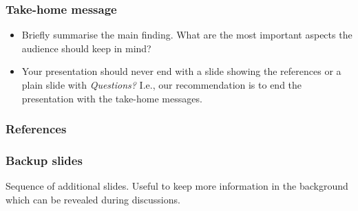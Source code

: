 \documentclass[t,english]{beamer}
\begin{document}

\begin{frame}
  \frametitle{Take-home message}
  
  \begin{itemize}
      \item Briefly summarise the main finding. What are the most important aspects the audience should keep in mind?
      \item Your presentation should never end with a slide showing the references or a plain slide with \emph{Questions?} I.e., our recommendation is to end the presentation with the take-home messages.
  \end{itemize}
\end{frame}

\appendix


\begin{frame}[allowframebreaks]
  \frametitle{References}
  \printbibliography[heading=none]
\end{frame}


\begin{frame}
  \frametitle{Backup slides}

  Sequence of additional slides. Useful to keep more information in the background which can be revealed during discussions.

\end{frame}
\end{document}
